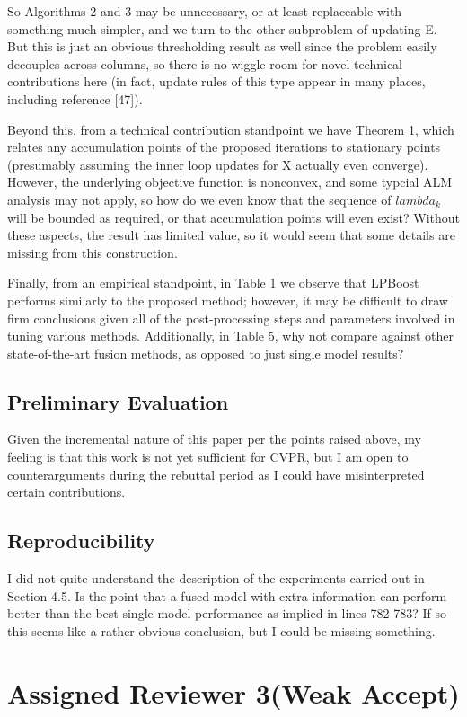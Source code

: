 \documentclass[letterpaper]{article}
\begin{document}
So Algorithms 2 and 3 may be unnecessary, or at least replaceable with something much simpler, and we turn to the other subproblem of updating E. But this is just an obvious thresholding result as well since the problem easily decouples across columns, so there is no wiggle room for novel technical contributions here (in fact, update rules of this type appear in many places, including reference [47]).

Beyond this, from a technical contribution standpoint we have Theorem 1, which relates any accumulation points of the proposed iterations to stationary points (presumably assuming the inner loop updates for X actually even converge). However, the underlying objective function is nonconvex, and some typcial ALM analysis may not apply, so how do we even know that the sequence of $lambda_k$ will be bounded as required, or that accumulation points will even exist? Without these aspects, the result has limited value, so it would seem that some details are missing from this construction.

Finally, from an empirical standpoint, in Table 1 we observe that LPBoost performs similarly to the proposed method; however, it may be difficult to draw firm conclusions given all of the post-processing steps and parameters involved in tuning various methods. Additionally, in Table 5, why not compare against other state-of-the-art fusion methods, as opposed to just single model results?

\subsection{Preliminary Evaluation}
Given the incremental nature of this paper per the points raised above, my feeling is that this work is not yet sufficient for CVPR, but I am open to counterarguments during the rebuttal period as I could have misinterpreted certain contributions.

\subsection{Reproducibility}
I did not quite understand the description of the experiments carried out in Section 4.5. Is the point that a fused model with extra information can perform better than the best single model performance as implied in lines 782-783? If so this seems like a rather obvious conclusion, but I could be missing something.

\section{Assigned Reviewer 3(Weak Accept)}
\end{document}
